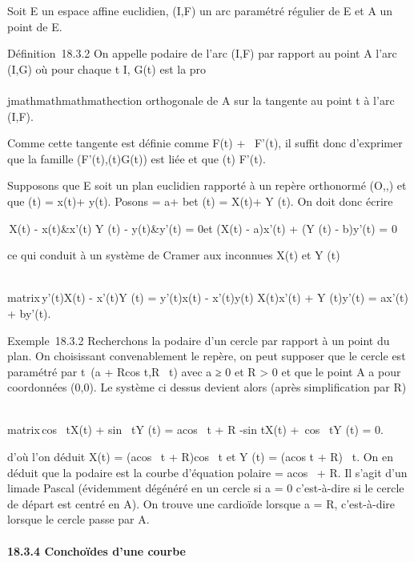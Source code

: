 Soit E un espace affine euclidien, (I,F) un arc paramétré régulier de E
et A un point de E.

Définition~18.3.2 On appelle podaire de l'arc (I,F) par rapport au point
A l'arc (I,G) où pour chaque t \in I, G(t) est la pro\\\\jmathmathmathmathection orthogonale
de A sur la tangente au point t à l'arc (I,F).

Comme cette tangente est définie comme F(t) + ~F'(t), il suffit donc
d'exprimer que la famille
(F'(t),\overrightarrowF(t)G(t)) est liée et que
\overrightarrowAG(t) \bot F'(t).

Supposons que E soit un plan euclidien rapporté à un repère orthonormé
(O,\vec\imath,) et que
\overrightarrowOF(t) = x(t)\vec\imath +
y(t). Posons
\overrightarrowOA = a\vec\imath +
b et \overrightarrowOG(t) =
X(t)\vec\imath + Y (t). On doit
donc écrire

\left
\textbar{}\matrix\,X(t) - x(t)&x'(t)
\cr Y (t) - y(t)&y'(t)\right \textbar{}
= 0\text et (X(t) - a)x'(t) + (Y (t) - b)y'(t) = 0

ce qui conduit à un système de Cramer aux inconnues X(t) et Y (t)

\left
\\matrix\,y'(t)X(t) -
x'(t)Y (t) = y'(t)x(t) - x'(t)y(t) \cr X(t)x'(t) + Y
(t)y'(t) = ax'(t) + by'(t)\right .

Exemple~18.3.2 Recherchons la podaire d'un cercle par rapport à un point
du plan. On choisissant convenablement le repère, on peut supposer que
le cercle est paramétré par t\mapsto~(a +
Rcos t,R\sin~ t) avec
a ≥ 0 et R \textgreater{} 0 et que le point A a pour coordonnées (0,0).
Le système ci dessus devient alors (après simplification par R)

\left
\\matrix\,cos~
tX(t) + sin~ tY (t) =
acos~ t + R \cr
-sin tX(t) +\ cos~ tY
(t) = 0\right .

d'où l'on déduit X(t) = (acos~ t +
R)cos~ t et Y (t) =
(acos t + R)\sin~ t.
On en déduit que la podaire est la courbe d'équation polaire \rho =
acos~ \theta + R. Il s'agit d'un
lima\ccon de Pascal (évidemment dégénéré en un cercle
si a = 0 c'est-à-dire si le cercle de départ est centré en A). On trouve
une cardioïde lorsque a = R, c'est-à-dire lorsque le cercle passe par A.

\paragraph{18.3.4 Conchoïdes d'une courbe}

